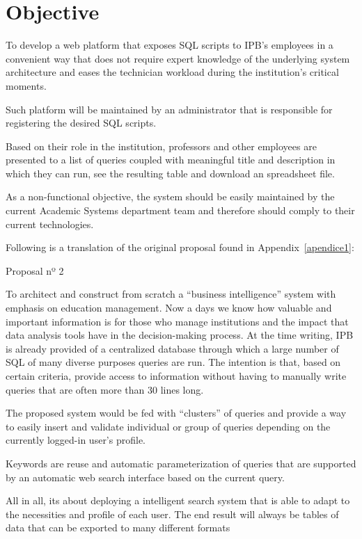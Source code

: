 \section{Objective}\label{objective}

To develop a web platform that exposes \gls{SQL} scripts to \gls{IPB}'s employees in a convenient way that does not require expert knowledge of the underlying system architecture and eases the technician workload during the institution's critical moments.

Such platform will be maintained by an administrator that is responsible for registering the desired \gls{SQL} scripts.

Based on their role in the institution, professors and other employees are presented to a list of queries coupled with meaningful title and description in which they can run, see the resulting table and download an spreadsheet file.

As a non-functional objective, the system should be easily maintained by the current Academic Systems department team and therefore should comply to their current technologies.

Following is a translation of the original proposal found in Appendix~\ref{apendice1}:
\begin{displayquote}
  Proposal nº 2

  To architect and construct from scratch a ``business intelligence'' system with emphasis on education management.
  Now a days we know how valuable and important information is for those who manage institutions and the impact that data analysis tools have in the decision-making process.
  At the time writing, \gls{IPB} is already provided of a centralized database through which a large number of \gls{SQL} of many diverse purposes queries are run.
  The intention is that, based on certain criteria, provide access to information without having to manually write queries that are often more than 30 lines long.

  The proposed system would be fed with ``clusters'' of queries and provide a way to easily insert and validate individual or group of queries depending on the currently logged-in user's profile.

  Keywords are reuse and automatic parameterization of queries that are supported by an automatic web search interface based on the current query.

  All in all, its about deploying a intelligent search system that is able to adapt to the necessities and profile of each user. The end result will always be tables of data that can be exported to many different formats
\end{displayquote}

